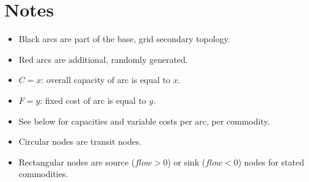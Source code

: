 \documentclass{article}
\begin{document}
\section{Notes}
\begin{itemize}
\item{Black arcs are part of the base, grid secondary topology.}
\item{Red arcs are additional, randomly generated.}
\item{$C=x$: overall capacity of arc is equal to $x$.}
\item{$F=y$: fixed cost of arc is equal to $y$.}
\item{See below for capacities and variable costs per arc, per commodity.}
\item{Circular nodes are transit nodes.}
\item{Rectangular nodes are source ($flow > 0$) or sink ($flow < 0$) nodes for stated commodities.}
\end{itemize}
\pagebreak
\end{document}
